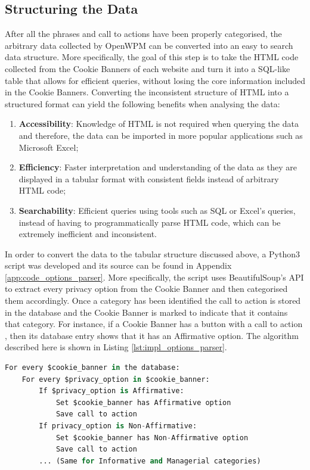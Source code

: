 \documentclass[../main.tex]{subfiles}
\begin{document}
\subsection{Structuring the Data}
After all the phrases and call to actions have been properly categorised, the arbitrary data collected by OpenWPM can be converted into an easy to search data structure. More specifically, the goal of this step is to take the HTML code collected from the Cookie Banners of each website and turn it into a SQL-like table that allows for efficient queries, without losing the core information included in the Cookie Banners. Converting the inconsistent structure of HTML into a structured format can yield the following benefits when analysing the data:

\begin{enumerate}
    \item \textbf{Accessibility}: Knowledge of HTML is not required when querying the data and therefore, the data can be imported in more popular applications such as Microsoft Excel;
    
    \item \textbf{Efficiency}: Faster interpretation and understanding of the data as they are displayed in a tabular format with consistent fields instead of arbitrary HTML code;
    
    \item \textbf{Searchability}: Efficient queries using tools such as SQL or Excel’s queries, instead of having to programmatically parse HTML code, which can be extremely inefficient and inconsistent.
\end{enumerate}

In order to convert the data to the tabular structure discussed above, a Python3 script was developed and its source can be found in Appendix \ref{app:code_options_parser}. More specifically, the script uses BeautifulSoup’s API to extract every privacy option from the Cookie Banner and then categorised them accordingly. Once a category has been identified the call to action is stored in the database and the Cookie Banner is marked to indicate that it contains that category. For instance, if a Cookie Banner has a button with a call to action , then its database entry shows that it has an Affirmative option. The algorithm described here is shown in Listing \ref{lst:impl_options_parser}.

\begin{lstlisting}[language=Python, caption=Pseudocode of the algorithm followed by the Cookie Banner Options parser., label=lst:impl_options_parser,captionpos=b, style=lst_style]
For every $cookie_banner in the database:
    For every $privacy_option in $cookie_banner:
        If $privacy_option is Affirmative:
            Set $cookie_banner has Affirmative option
            Save call to action
        If privacy_option is Non-Affirmative:
            Set $cookie_banner has Non-Affirmative option
            Save call to action
        ... (Same for Informative and Managerial categories)
\end{lstlisting}
\end{document}
